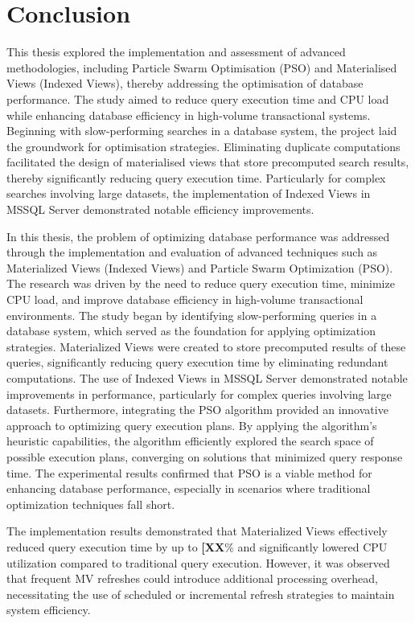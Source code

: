 \section{Conclusion}
This thesis explored the implementation and assessment of advanced methodologies, including Particle Swarm Optimisation (PSO) and Materialised Views (Indexed Views), thereby addressing the optimisation of database performance. The study aimed to reduce query execution time and CPU load while enhancing database efficiency in high-volume transactional systems. 
Beginning with slow-performing searches in a database system, the project laid the groundwork for optimisation strategies. Eliminating duplicate computations facilitated the design of materialised views that store precomputed search results, thereby significantly reducing query execution time. Particularly for complex searches involving large datasets, the implementation of Indexed Views in MSSQL Server demonstrated notable efficiency improvements.


In this thesis, the problem of optimizing database performance was addressed through the implementation and evaluation of advanced techniques such as Materialized Views (Indexed Views) and Particle Swarm Optimization (PSO). The research was driven by the need to reduce query execution time, minimize CPU load, and improve database efficiency in high-volume transactional environments. The study began by identifying slow-performing queries in a database system, which served as the foundation for applying optimization strategies. Materialized Views were created to store precomputed results of these queries, significantly reducing query execution time by eliminating redundant computations. The use of Indexed Views in MSSQL Server demonstrated notable improvements in performance, particularly for complex queries involving large datasets.
Furthermore, integrating the PSO algorithm provided an innovative approach to optimizing query execution plans. By applying the algorithm's heuristic capabilities, the algorithm efficiently explored the search space of possible execution plans, converging on solutions that minimized query response time. The experimental results confirmed that PSO is a viable method for enhancing database performance, especially in scenarios where traditional optimization techniques fall short.

The implementation results demonstrated that Materialized Views effectively reduced query execution time by up to \textbf{[XX}\% and significantly lowered CPU utilization compared to traditional query execution. However, it was observed that frequent MV refreshes could introduce additional processing overhead, necessitating the use of scheduled or incremental refresh strategies to maintain system efficiency.

